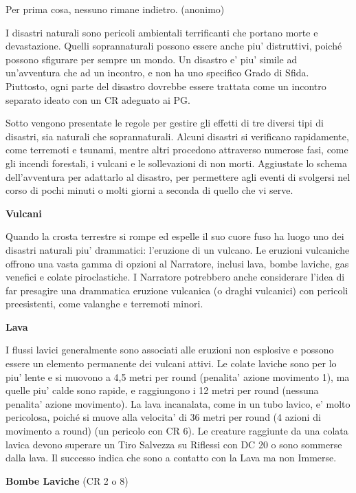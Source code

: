 \documentclass[a4paper,11pt,twoside,openany]{dndbook}
\begin{document}
\label{avventure-e-disastri}
\begin{quotebox}
Per prima cosa, nessuno rimane indietro. (anonimo)
\end{quotebox}
I disastri naturali sono pericoli ambientali terrificanti che portano morte e devastazione. Quelli soprannaturali posso­no essere anche piu' distruttivi, poiché possono sfigurare per sempre un mondo. Un disastro e' piu' simile ad un'avventura che ad un incontro, e non ha uno specifico Grado di Sfida. Piuttosto, ogni parte del disastro dovrebbe essere trattata come un incontro separato ideato con un CR adeguato ai PG.

Sotto vengono presentate le regole per gestire gli effetti di tre diversi tipi di disastri, sia naturali che soprannaturali. Alcuni disastri si verificano rapidamente, come terremoti e tsunami, mentre altri procedono attraverso numerose fasi, come gli incendi forestali, i vulcani e le sollevazioni di non morti. Aggiustate lo schema dell'avventura per adattarlo al disastro, per permettere agli eventi di svolgersi nel corso di pochi minuti o molti giorni a seconda di quello che vi serve.

\textbf{Vulcani}

Quando la crosta terrestre si rompe ed espelle il suo cuore fuso ha luogo uno dei disastri naturali piu' drammatici: l'eruzione di un vulcano. Le eruzioni vulcaniche offrono una vasta gamma di opzioni al Narratore, inclusi lava, bombe laviche, gas venefici e colate piroclastiche. I Narratore potrebbero anche considerare l'idea di far presagire una drammatica eruzione vulcanica (o draghi vulcanici) con pericoli preesistenti, come valanghe e terremoti minori.

\textbf{Lava}

I flussi lavici generalmente sono associati alle eruzioni non esplosive e possono essere un elemento permanente dei vulcani attivi. Le colate laviche sono per lo piu' lente e si muovono a 4,5 metri per round (penalita' azione movimento 1), ma quelle piu' calde sono rapide, e raggiungono i 12 metri per round (nessuna penalita' azione movimento). La lava incanalata, come in un tubo lavico, e' molto pericolosa, poiché si muove alla velocita' di 36 metri per round (4 azioni di movimento a round) (un pericolo con CR 6). Le creature raggiunte da una colata lavica devono superare un Tiro Salvezza su Riflessi con DC 20 o sono sommerse dalla lava. Il successo indica che sono a contatto con la Lava ma non Immerse.

\textbf{Bombe Laviche} (CR 2 o 8)
\end{document}
